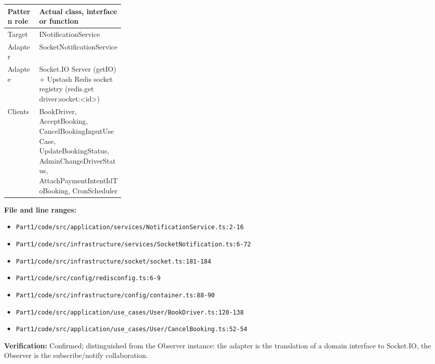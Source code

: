 \documentclass[11pt,a4paper]{article}
\begin{document}
\noindent\begin{tabularx}{\linewidth}{@{}P{0.27\linewidth}Y@{}}
\toprule Pattern role & Actual class, interface or function \\ \midrule
Target & INotificationService \\
Adapter & SocketNotificationService \\
Adaptee & Socket.IO Server (getIO) + Upstash Redis socket registry (redis.get driver:socket:\textless{}id\textgreater{}) \\
Clients & BookDriver, AcceptBooking, CancelBookingInputUseCase, UpdateBookingStatus, AdminChangeDriverStatus, AttachPaymentIntentIdToBooking, CronScheduler \\
\bottomrule
\end{tabularx}

\noindent\textbf{File and line ranges:}\begin{itemize}\setlength\itemsep{0pt}\item \texttt{Part1/\allowbreak{}code/\allowbreak{}src/\allowbreak{}application/\allowbreak{}services/\allowbreak{}NotificationService.\allowbreak{}ts:2-16}\item \texttt{Part1/\allowbreak{}code/\allowbreak{}src/\allowbreak{}infrastructure/\allowbreak{}services/\allowbreak{}SocketNotification.\allowbreak{}ts:6-72}\item \texttt{Part1/\allowbreak{}code/\allowbreak{}src/\allowbreak{}infrastructure/\allowbreak{}socket/\allowbreak{}socket.\allowbreak{}ts:181-184}\item \texttt{Part1/\allowbreak{}code/\allowbreak{}src/\allowbreak{}config/\allowbreak{}redisconfig.\allowbreak{}ts:6-9}\item \texttt{Part1/\allowbreak{}code/\allowbreak{}src/\allowbreak{}infrastructure/\allowbreak{}config/\allowbreak{}container.\allowbreak{}ts:88-90}\item \texttt{Part1/\allowbreak{}code/\allowbreak{}src/\allowbreak{}application/\allowbreak{}use\_\allowbreak{}cases/\allowbreak{}User/\allowbreak{}BookDriver.\allowbreak{}ts:120-138}\item \texttt{Part1/\allowbreak{}code/\allowbreak{}src/\allowbreak{}application/\allowbreak{}use\_\allowbreak{}cases/\allowbreak{}User/\allowbreak{}CancelBooking.\allowbreak{}ts:52-54}\end{itemize}
\noindent\textbf{Verification:} Confirmed; distinguished from the Observer instance: the adapter is the translation of a domain interface to Socket.IO, the Observer is the subscribe/notify collaboration.
\end{document}
